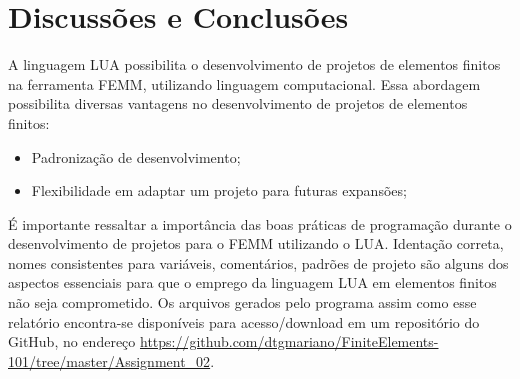 \section{Discussões e Conclusões}
A linguagem LUA possibilita o desenvolvimento de projetos de elementos finitos na ferramenta FEMM, utilizando linguagem computacional. Essa abordagem possibilita diversas vantagens no desenvolvimento de projetos de elementos finitos:
\begin{itemize}
  \item Padronização de desenvolvimento;
  \item Flexibilidade em adaptar um projeto para futuras expansões;
\end{itemize}
É importante ressaltar a importância das boas práticas de programação durante o desenvolvimento de projetos para o FEMM utilizando o LUA. Identação correta, nomes consistentes para variáveis, comentários, padrões de projeto são alguns dos aspectos essenciais para que o emprego da linguagem LUA em elementos finitos não seja comprometido. Os arquivos gerados pelo programa assim como esse relatório encontra-se disponíveis para acesso/download em um repositório do GitHub, no endereço \url{https://github.com/dtgmariano/FiniteElements-101/tree/master/Assignment_02}.
